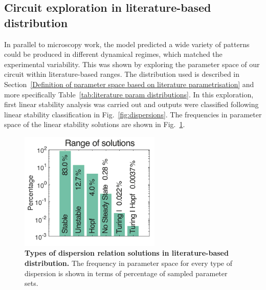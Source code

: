 \subsection{Circuit exploration in literature-based distribution}
In parallel to microscopy work, the model predicted a wide variety of patterns could be produced in different dynamical regimes, which matched the experimental variability.
This was shown by exploring the parameter space of our circuit within literature-based ranges.
The distribution used is described in Section~\ref{Definition of parameter space based on literature parametrisation} and more specifically Table~\ref{tab:literature param distributions}.
In this exploration, first linear stability analysis was carried out and outputs were classified following linear stability classification in Fig.~\ref{fig:dispersions}.
The frequencies in parameter space of the linear stability solutions are shown in Fig.~\ref{system_class_frequencies}.
\begin{figure}[H]
    \centering

    \includegraphics[width=0.6\textwidth]{chapters/Chapter 3/system_class_frequencies}
    \caption{\textbf{Types of dispersion relation solutions in literature-based distribution.} The frequency in parameter space for every type of dispersion is shown in terms of percentage of sampled parameter sets.}
    \label{system_class_frequencies}
\end{figure}

